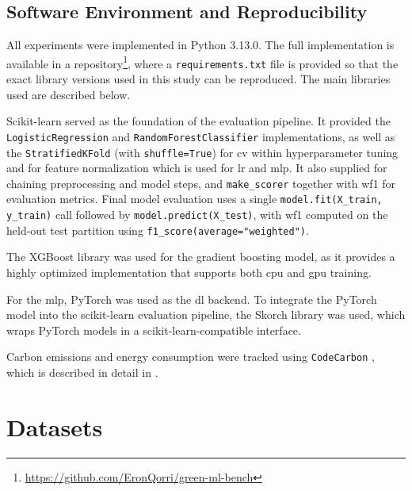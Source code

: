 \subsection{Software Environment and Reproducibility}
\label{implementation_sw_env}

All experiments were implemented in Python 3.13.0. The full implementation is available in a repository\footnote{\url{https://github.com/EronQorri/green-ml-bench}}, where a \texttt{requirements.txt} file is provided so that the exact library versions used in this study can be reproduced. The main libraries used are described below.

Scikit-learn \parencite{pedregosaScikitlearnMachineLearning2011} served as the foundation of the evaluation pipeline. It provided the \texttt{LogisticRegression} and \texttt{RandomForestClassifier} implementations, as well as the \texttt{StratifiedKFold} (with \texttt{shuffle=True}) for \gls{cv} within hyperparameter tuning and  for feature normalization which is used for \gls{lr} and \gls{mlp}. It also supplied  for chaining preprocessing and model steps, and \texttt{make\_scorer} together with \gls{wf1} for evaluation metrics. Final model evaluation uses a single \texttt{model.fit(X\_train, y\_train)} call followed by \texttt{model.predict(X\_test)}, with \gls{wf1} computed on the held-out test partition using \texttt{f1\_score(average="weighted")}.

The XGBoost library \parencite{XGBoostDocumentationXgboost} was used for the gradient boosting model, as it provides a highly optimized implementation that supports both \gls{cpu} and \gls{gpu} training.

For the \gls{mlp}, PyTorch \cite{paszkePyTorchImperativeStyle2019} was used as the \gls{dl} backend. To integrate the PyTorch model into the scikit-learn evaluation pipeline, the Skorch library \cite{ghoshSkorchBridgePyTorch2024} was used, which wraps PyTorch models in a scikit-learn-compatible interface.

Carbon emissions and energy consumption were tracked using \texttt{CodeCarbon} \parencite{courtyMlco2CodecarbonV2412024}, which is described in detail in .

\section{Datasets}
\label{experimental_dataset}

